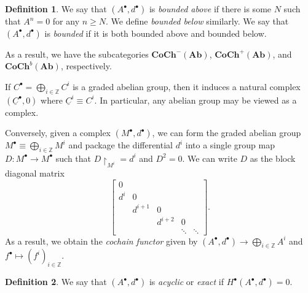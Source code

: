 \documentclass[10pt,letterpaper,cm]{nupset}
\theoremstyle{definition}
\newtheorem{definition}{Definition}[subsection]
\theoremstyle{theorem}
\theoremstyle{remark}
\newcommand{\Z}{\mathbb Z}
\newcommand{\1}{\mathbf{1}}
\newcommand{\0}{\vec 0}
\begin{document}
\begin{definition}
We say that $\left(A^{\bullet}, d^{\bullet}\right)$ is \textit{bounded above} if there is some $N$ such that $A^n =0$ for any $n\geq N$. We define \textit{bounded below} similarly. We say that $\left(A^{\bullet}, d^{\bullet}\right)$ is \textit{bounded} if it is both bounded above and bounded below. 
\end{definition}

As a result, we have the subcategories $\mathbf{CoCh}^{{-}}(\mathbf{Ab})$, $\mathbf{CoCh}^{+}(\mathbf{Ab})$, and $\mathbf{CoCh}^{b}(\mathbf{Ab})$, respectively. 

\medskip


If $C^{\bullet} = \bigoplus_{i\in \Z} C^i$ is a graded abelian group, then it induces a natural complex $(\underline{C}^{\bullet}, 0)$ where $\underline{C}^i \equiv C^i$. In particular, any abelian group may be viewed as a complex. 

Conversely, given a complex $(M^{\bullet}, d^{\bullet})$, we can form the graded abelian group $M^{\bullet} \equiv  \bigoplus_{i\in \Z} M^i$ and package the differential $d^i$ into a single group map $D: M^{\bullet} \to M^{\bullet}$ such that $D\restriction_{M^i} = d^i$ and $D^2 =0$. We can write $D$ as the block diagonal matrix
$$  \begin{bmatrix} 0 & & &  & \\  d^i &0   &  &  & \\  &  d^{i+1} & 0  &   & \\ &   & d^{i+2}  & 0   &   \\  &  & &  \ddots &   \ddots \end{bmatrix} .$$
As a result, we obtain the \textit{cochain functor} given by $\left(A^{\bullet}, d^{\bullet}\right) \to \bigoplus_{i\in \Z} A^i$ and $f^{\bullet} \mapsto (f^i)_{i\in \Z}$.



\begin{definition}
We say that $\left(A^{\bullet}, d^{\bullet}\right)$ is \textit{acyclic} or \textit{exact} if $H^{\bullet}\left(A^{\bullet}, d^{\bullet}\right)=0$.
\end{definition}

\medskip
\end{document}
